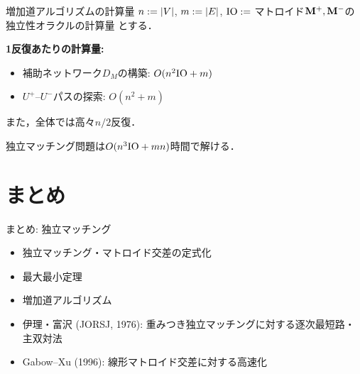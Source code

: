 \documentclass[14pt,aspectratio=169,xcolor=dvipsnames,table,onlytextwidth,dvipdfmx]{beamer}
\begin{document}
\begin{frame}{増加道アルゴリズムの計算量}
    \small
    $n := \lvert V\rvert$, $m := \lvert E\rvert$, $\mathrm{IO}:=$ マトロイド$\mathbf{M}^+, \mathbf{M}^-$の独立性オラクルの計算量 
    とする．

    \bigskip
    \textbf{1反復あたりの計算量:}
    \begin{itemize}
        \item 補助ネットワーク$D_M$の構築: $O(n^2 \mathrm{IO} + m)$
        \item $U^+$--$U^-$パスの探索: $O(n^2 + m)$
    \end{itemize}
    
    また，全体では高々$n/2$反復．

    \vfill
    \begin{theorem}
        独立マッチング問題は$O(n^3 \mathrm{IO} + mn)$時間で解ける．
    \end{theorem}
\end{frame}

%
\section{まとめ}
\begin{frame}{まとめ: 独立マッチング}

    \begin{itemize}
        \item 独立マッチング・マトロイド交差の定式化
        \item 最大最小定理
        \item 増加道アルゴリズム
    \end{itemize}

    \bigskip
    \begin{itemize}
        \item 伊理・富沢 (JORSJ, 1976): 重みつき独立マッチングに対する逐次最短路・主双対法 
        \item Gabow--Xu (1996): 線形マトロイド交差に対する高速化 
    \end{itemize}
\end{frame}
\end{document}
